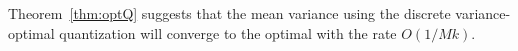 \documentclass{article}
\newcommand{\setI}{\mathcal{I}}
\begin{document}
Theorem~\ref{thm:optQ} suggests that the mean variance using the discrete variance-optimal quantization will converge to the optimal with the rate $O(1/Mk)$.








\end{document}
